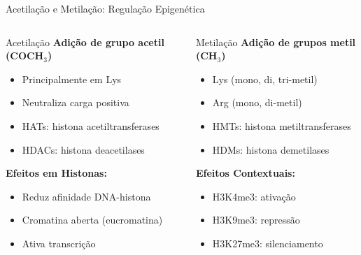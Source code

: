 \begin{frame}[shrink=5]{Acetilação e Metilação: Regulação Epigenética}
\begin{columns}
\begin{block}{Acetilação}
\textbf{Adição de grupo acetil (COCH$_3$)}
\begin{itemize}
    \item Principalmente em Lys
    \item Neutraliza carga positiva
    \item HATs: histona acetiltransferases
    \item HDACs: histona deacetilases
\end{itemize}

\textbf{Efeitos em Histonas:}
\begin{itemize}
    \item Reduz afinidade DNA-histona
    \item Cromatina aberta (eucromatina)
    \item Ativa transcrição
\end{itemize}
\end{block}

\begin{block}{Metilação}
\textbf{Adição de grupos metil (CH$_3$)}
\begin{itemize}
    \item Lys (mono, di, tri-metil)
    \item Arg (mono, di-metil)
    \item HMTs: histona metiltransferases
    \item HDMs: histona demetilases
\end{itemize}

\textbf{Efeitos Contextuais:}
\begin{itemize}
    \item H3K4me3: ativação
    \item H3K9me3: repressão
    \item H3K27me3: silenciamento
\end{itemize}
\end{block}
\end{columns}

\vspace{0.3cm}

\end{frame}

